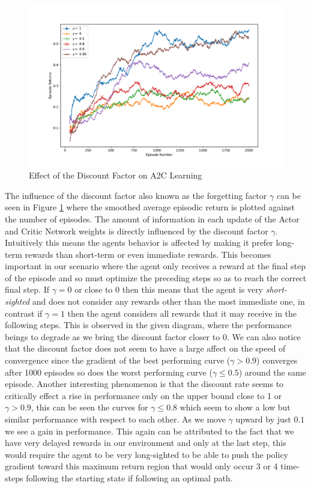 \documentclass[12pt]{extarticle}
\numberwithin{equation}{section}
\begin{document}
	\begin{figure}[H]
		\hspace*{-3.25cm}   
		\centering
		\includegraphics[scale=0.8]{a2c-dis-fact.pdf}
		\caption{Effect of the Discount Factor on A2C Learning
			\label{a2c_dis_fact}}
	\end{figure}
	The influence of the discount factor also known as the forgetting factor $\gamma$ can be seen in Figure \ref{a2c_dis_fact} where the smoothed average episodic return is plotted against the number of episodes. The amount of information in each update of the Actor and Critic Network weights is directly influenced by the discount factor $\gamma$. Intuitively this means the agents behavior is affected by making it prefer long-term rewards than short-term or even immediate rewards. This becomes important in our scenario where the agent only receives a reward at the final step of the episode and so must optimize the preceding steps so as to reach the correct final step. If $\gamma = 0$ or close to 0 then this means that the agent is very \textit{short-sighted} and does not consider any rewards other than the most immediate one, in contrast if $\gamma = 1$ then the agent considers all rewards that it may receive in the following steps. This is observed in the given diagram, where the performance beings to degrade as we bring the discount factor closer to 0. We can also notice that the discount factor does not seem to have a large affect on the speed of convergence since the gradient of the best performing curve ($\gamma > 0.9$) converges after 1000 episodes so does the worst performing curve ($\gamma \leq 0.5$) around the same episode. Another interesting phenomenon is that the discount rate seems to critically effect a rise in performance only on the upper bound close to 1 or $\gamma > 0.9$, this can be seen the curves for $\gamma \leq 0.8$ which seem to show a low but similar performance with respect to each other. As we move $\gamma$ upward by just $0.1$ we see a gain in performance. This again can be attributed to the fact that we have very delayed rewards in our environment and only at the last step, this would require the agent to be very long-sighted to be able to push the policy gradient toward this maximum return region that would only occur 3 or 4 time-steps following the starting state if following an optimal path.
	
\end{document}
